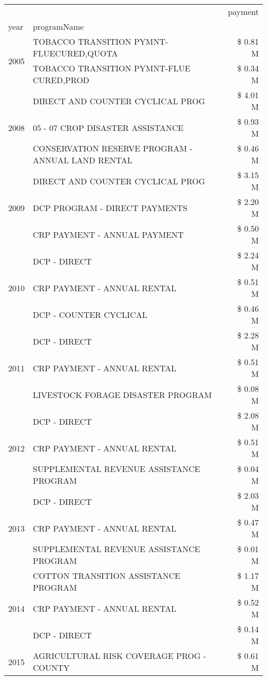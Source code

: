 \begin{tabular}{llr}
\toprule
 &  & payment \\
year & programName &  \\
\midrule
\multirow[t]{2}{*}{2005} & TOBACCO TRANSITION PYMNT-FLUECURED,QUOTA & \$ 0.81 M \\
 & TOBACCO TRANSITION PYMNT-FLUE CURED,PROD & \$ 0.34 M \\
\cline{1-3}
\multirow[t]{3}{*}{2008} & DIRECT AND COUNTER CYCLICAL PROG & \$ 4.01 M \\
 & 05 - 07 CROP DISASTER ASSISTANCE & \$ 0.93 M \\
 & CONSERVATION RESERVE PROGRAM - ANNUAL LAND RENTAL & \$ 0.46 M \\
\cline{1-3}
\multirow[t]{3}{*}{2009} & DIRECT AND COUNTER CYCLICAL PROG & \$ 3.15 M \\
 & DCP PROGRAM - DIRECT PAYMENTS & \$ 2.20 M \\
 & CRP PAYMENT - ANNUAL PAYMENT & \$ 0.50 M \\
\cline{1-3}
\multirow[t]{3}{*}{2010} & DCP - DIRECT & \$ 2.24 M \\
 & CRP PAYMENT - ANNUAL RENTAL & \$ 0.51 M \\
 & DCP - COUNTER CYCLICAL & \$ 0.46 M \\
\cline{1-3}
\multirow[t]{3}{*}{2011} & DCP - DIRECT & \$ 2.28 M \\
 & CRP PAYMENT - ANNUAL RENTAL & \$ 0.51 M \\
 & LIVESTOCK FORAGE DISASTER PROGRAM & \$ 0.08 M \\
\cline{1-3}
\multirow[t]{3}{*}{2012} & DCP - DIRECT & \$ 2.08 M \\
 & CRP PAYMENT - ANNUAL RENTAL & \$ 0.51 M \\
 & SUPPLEMENTAL REVENUE ASSISTANCE PROGRAM & \$ 0.04 M \\
\cline{1-3}
\multirow[t]{3}{*}{2013} & DCP - DIRECT & \$ 2.03 M \\
 & CRP PAYMENT - ANNUAL RENTAL & \$ 0.47 M \\
 & SUPPLEMENTAL REVENUE ASSISTANCE PROGRAM & \$ 0.01 M \\
\cline{1-3}
\multirow[t]{3}{*}{2014} & COTTON TRANSITION ASSISTANCE PROGRAM & \$ 1.17 M \\
 & CRP PAYMENT - ANNUAL RENTAL & \$ 0.52 M \\
 & DCP - DIRECT & \$ 0.14 M \\
\cline{1-3}
\multirow[t]{3}{*}{2015} & AGRICULTURAL RISK COVERAGE PROG - COUNTY & \$ 0.61 M \\

\end{tabular}
